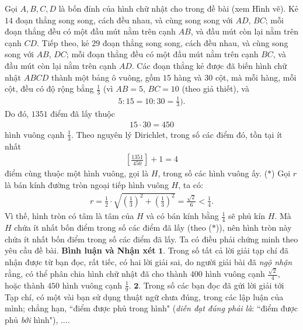 \begin{multicols}{2}
\begin{figure}[H]
\begin{tikzpicture}[thachthuctoanhoc,scale=0.45]
\end{tikzpicture}
		\vspace*{-10pt}
	\end{figure}
	Gọi $A, B, C, D$ là bốn đỉnh của hình chữ nhật cho trong đề bài (xem Hình vẽ).
	\vskip 0.05cm
	Kẻ $14$ đoạn thẳng song song, cách đều nhau, và cùng song song với $AD$, $BC$; mỗi đoạn thẳng đều có một đầu mút nằm trên cạnh $AB$, và đầu mút còn lại nằm trên cạnh $CD$.
	\vskip 0.05cm
	Tiếp theo, kẻ $29$ đoạn thẳng song song, cách đều nhau, và cùng song song với $AB$, $DC$; mỗi đoạn thẳng đều có một đầu mút nằm trên cạnh $BC$, và đầu mút còn lại nằm trên cạnh $AD$.
	\vskip 0.05cm
	Các đoạn thẳng kẻ được đã biến hình chữ nhật $ABCD$ thành một bảng ô vuông, gồm $15$ hàng và $30$ cột, mà mỗi hàng, mỗi cột, đều có độ rộng bằng  $\frac{1}{3}$ (vì $AB = 5$, $BC = 10$ (theo giả thiết), và
	\begin{align*}
		5:15 = 10:30 = \frac{1}{3}).
	\end{align*}
	Do đó, $1351$ điểm đã lấy thuộc
	\begin{align*}
		15 \cdot 30 = 450
	\end{align*}
	hình vuông cạnh $\frac{1}{3}$.
	\vskip 0.05cm 
	Theo nguyên lý Dirichlet, trong số các điểm đó, tồn tại ít nhất
	\begin{align*}
		\left[ {\frac{{1351}}{{450}}} \right] + 1 = 4
	\end{align*}
	điểm cùng thuộc một hình vuông, gọi là $H$, trong số các hình vuông ấy.  \hfill ($*$)
	\vskip 0.05cm
	Gọi $r$ là bán kính đường tròn ngoại tiếp hình vuông $H$, ta có:
	\begin{align*}
		r = \frac{1}{2} \cdot \sqrt {{{\left( {\frac{1}{3}} \right)}^2} + {{\left( {\frac{1}{3}} \right)}^2}}  = \frac{{\sqrt 2 }}{6} < \frac{1}{4}.
	\end{align*}
	Vì thế, hình tròn có tâm là tâm của $H$ và có bán kính bằng $\frac{1}{4}$ sẽ phủ kín $H$. Mà $H$ chứa ít nhất bốn điểm trong số các điểm đã lấy (theo ($*$)), nên hình tròn này chứa ít nhất bốn điểm trong số các điểm đã lấy. Ta có điều phải chứng minh theo yêu cầu đề bài.
	\vskip 0.05cm
	\textbf{\color{thachthuctoanhoc}Bình luận và Nhận xét}
	\vskip 0.05cm
	$\pmb{1.}$ Trong số tất cả lời giải tạp chí đã nhận được từ bạn đọc, rất tiếc, có hai lời giải sai, do người giải bài đã \textit{ngộ nhận} rằng, có thể phân chia hình chữ nhật đã cho thành $400$ hình vuông cạnh $\frac{\sqrt{2}}{4}$, hoặc thành $450$ hình vuông cạnh $\frac{1}{9}$.
	\vskip 0.05cm 
	$\pmb{2.}$ Trong số các bạn đọc đã gửi lời giải tới Tạp chí, có một vài bạn sử dụng thuật ngữ chưa đúng, trong các lập luận của mình; chẳng hạn, ``điểm được phủ trong hình" (\textit{diễn đạt đúng phải là}: ``điểm được phủ \textit{bởi} hình"), ....

\end{multicols}
